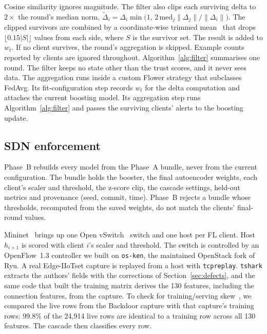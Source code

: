 Cosine similarity ignores magnitude. The filter also clips each surviving delta to $2\times$ the round's median norm, $\tilde\Delta_i=\Delta_i\min\bigl(1,\,2\,\mathrm{med}_j\lVert\Delta_j\rVert/\lVert\Delta_i\rVert\bigr)$. The clipped survivors are combined by a coordinate-wise trimmed mean~\cite{yin2018} that drops $\lfloor 0.15|S|\rfloor$ values from each side, where $S$ is the survivor set. The result is added to $w_t$. If no client survives, the round's aggregation is skipped. Example counts reported by clients are ignored throughout. Algorithm~\ref{alg:filter} summarises one round. The filter keeps no state other than the trust scores, and it never sees data. The aggregation runs inside a custom Flower strategy that subclasses FedAvg. Its fit-configuration step records $w_t$ for the delta computation and attaches the current boosting model. Its aggregation step runs Algorithm~\ref{alg:filter} and passes the surviving clients' alerts to the boosting update.

\subsection{SDN enforcement}
\label{sec:sdn}
Phase~B rebuilds every model from the Phase~A bundle, never from the current configuration. The bundle holds the booster, the final autoencoder weights, each client's scaler and threshold, the z-score clip, the cascade settings, held-out metrics and provenance (seed, commit, time). Phase~B rejects a bundle whose thresholds, recomputed from the saved weights, do not match the clients' final-round values.

Mininet~\cite{lantz2010} brings up one Open vSwitch~\cite{pfaff2015} switch and one host per FL client. Host $h_{i+1}$ is scored with client $i$'s scaler and threshold. The switch is controlled by an OpenFlow~1.3 controller we built on \texttt{os-ken}, the maintained OpenStack fork of Ryu. A real Edge-IIoTset capture is replayed from a host with \texttt{tcpreplay}. \texttt{tshark} extracts the authors' fields with the corrections of Section~\ref{sec:defects}, and the same code that built the training matrix derives the 130 features, including the connection features, from the capture. To check for training/serving skew~\cite{breck2019}, we compared the live rows from the Backdoor capture with that capture's training rows: 99.8\% of the 24,914 live rows are identical to a training row across all 130 features. The cascade then classifies every row.

